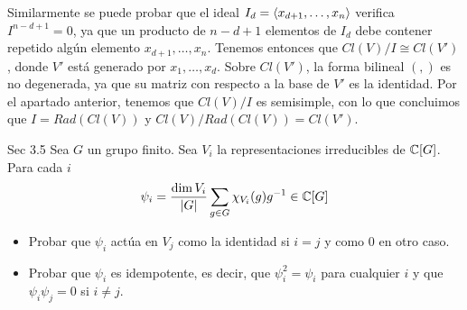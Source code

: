 \documentclass[twoside]{article}
\begin{document}
\begin{enumerate}[(i)]
Similarmente se puede probar que el ideal $I_d=\langle{x_{d+1},\dots, x_n}\rangle$ verifica $I^{n-d+1}=0$, ya que un producto de $n-d+1$ elementos de $I_d$ debe contener repetido algún elemento $x_{d+1},\dots, x_n$. Tenemos entonces que $Cl(V)/I\cong Cl(V')$, donde $V'$ está generado por $x_1,\dots, x_d$. Sobre $Cl(V')$, la forma bilineal $(,)$ es no degenerada, ya que su matriz con respecto a la base de $V'$ es la identidad. Por el apartado anterior, tenemos que $Cl(V)/I$ es semisimple, con lo que concluimos que $I=Rad(Cl(V))$ y $Cl(V)/Rad(Cl(V))=Cl(V')$. 
\end{enumerate}

\newpage
\begin{ejercicio}{Sec 3.5}
Sea $G$ un grupo finito. Sea $V_i$ la representaciones irreducibles de $\mathbb{C}[G]$. Para cada $i$ 
$$
\psi_i = \frac{\dim V_i}{|G|}\sum_{g\in G}\chi_{V_i}(g)g^{-1}\in \mathbb{C}[G]
$$
\begin{itemize}
\item Probar que $\psi_i$ actúa en $V_j$ como la identidad si $i=j$ y como $0$ en otro caso.
\item Probar que $\psi_i$ es idempotente, es decir, que $\psi_i^2=\psi_i$ para cualquier $i$ y que $\psi_i\psi_j = 0$ si $i\neq j$.
\end{itemize}
\end{ejercicio}
\end{document}
